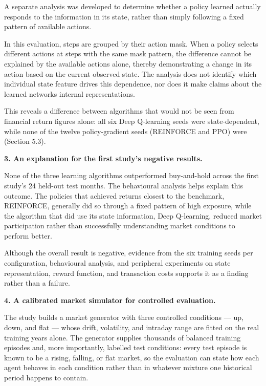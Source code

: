 A separate analysis was developed to determine whether a policy learned
actually responds to the information in its state, rather than simply
following a fixed pattern of available actions.

In this evaluation, steps are grouped by their action mask. When a
policy selects different actions at steps with the same mask pattern,
the difference cannot be explained by the available actions alone,
thereby demonstrating a change in its action based on the current
observed state. The analysis does not identify which individual state
feature drives this dependence, nor does it make claims about the
learned network\textquotesingle s internal representations.

This reveals a difference between algorithms that would not be seen from
financial return figures alone: all six Deep Q-learning seeds were
state-dependent, while none of the twelve policy-gradient seeds
(REINFORCE and PPO) were (Section 5.3).

\textbf{3. An explanation for the first study's negative results.}

None of the three learning algorithms outperformed buy-and-hold across
the first study's 24 held-out test months. The behavioural analysis helps explain this
outcome. The policies that achieved returns closest to the benchmark,
REINFORCE, generally did so through a fixed pattern of high exposure,
while the algorithm that did use its state information, Deep Q-learning,
reduced market participation rather than successfully understanding
market conditions to perform better.

Although the overall result is negative, evidence from the six training
seeds per configuration, behavioural analysis, and peripheral
experiments on state representation, reward function, and transaction
costs supports it as a finding rather than a failure.

\textbf{4. A calibrated market simulator for controlled evaluation.}

The study builds a market generator with three controlled conditions ---
up, down, and flat --- whose drift, volatility, and intraday range are
fitted on the real training years alone. The generator supplies thousands of balanced training episodes
and, more importantly, labelled test conditions: every test episode is
known to be a rising, falling, or flat market, so the evaluation can
state how each agent behaves in each condition rather than in whatever
mixture one historical period happens to contain.

